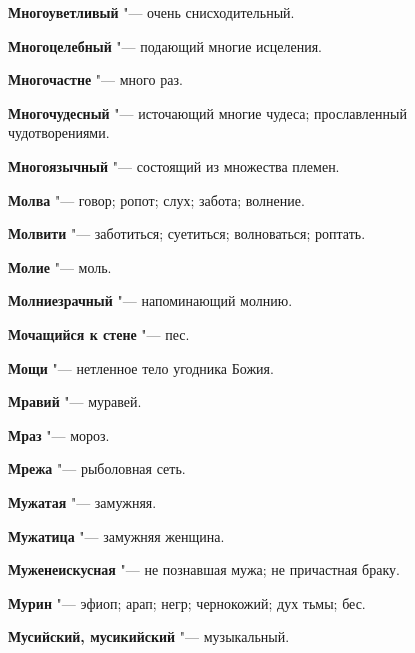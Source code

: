 \begin{mymulticols}{2}
\noindent\textbf{Многоуветливый} "--- очень снисходительный. 




\noindent\textbf{Многоцелебный} "--- подающий многие исцеления. 




\noindent\textbf{Многочастне} "--- много раз. 




\noindent\textbf{Многочудесный} "--- источающий многие чудеса; прославленный чудотворениями. 




\noindent\textbf{Многоязычный} "--- состоящий из множества племен. 




\noindent\textbf{Молва} "--- говор; ропот; слух; забота; волнение. 




\noindent\textbf{Молвити} "--- заботиться; суетиться; волноваться; роптать. 




\noindent\textbf{Молие} "--- моль. 




\noindent\textbf{Молниезрачный} "--- напоминающий молнию. 




\noindent\textbf{Мочащийся к стене} "--- пес. 




\noindent\textbf{Мощи} "--- нетленное тело угодника Божия. 




\noindent\textbf{Мравий} "--- муравей. 




\noindent\textbf{Мраз} "--- мороз. 




\noindent\textbf{Мрежа} "--- рыболовная сеть. 




\noindent\textbf{Мужатая} "--- замужняя. 




\noindent\textbf{Мужатица} "--- замужняя женщина. 




\noindent\textbf{Муженеискусная} "--- не познавшая мужа; не причастная браку. 




\noindent\textbf{Мурин} "--- эфиоп; арап; негр; чернокожий; дух тьмы; бес. 




\noindent\textbf{Мусийский, мусикийский} "--- музыкальный. 





\end{mymulticols}
